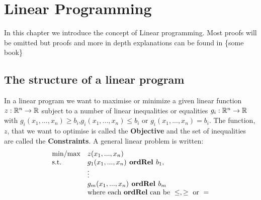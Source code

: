 \chapter{Linear Programming}
In this chapter we introduce the concept of Linear programming. Most proofs will be omitted but proofs and more in depth explanations can be found in \{some book\}
\section{The structure of a linear program}
In a linear program we want to maximise or minimize a given linear function $z:\mathbb{R}^n \rightarrow \mathbb{R}$ subject to a number of linear inequalities or equalities $g_i:\mathbb{R}^n \rightarrow \mathbb{R}$ with $g_i(x_1,...,x_n)\geq b_i$,$g_i(x_1,...,x_n)\leq b_i$ or $g_i(x_1,...,x_n)= b_i$. The function, $z$, that we want to optimise is called the \textbf{Objective} and the set of inequalities are called the \textbf{Constraints}. A general linear problem is written:
\begin{align}\label{lpform}
\begin{array}{ll@{}ll}
\text{min/max} &z(x_1,...,x_n)&\\
\text{s.t.} &g_1(x_1,...,x_n) \textbf{ ordRel } b_1,&\\
&\vdots&\\
&g_m(x_1,...,x_n) \textbf{ ordRel } b_m&\\
&\text{where each \textbf{ordRel} can be }\leq,\geq \text{ or } =&
\end{array}
\end{align}

